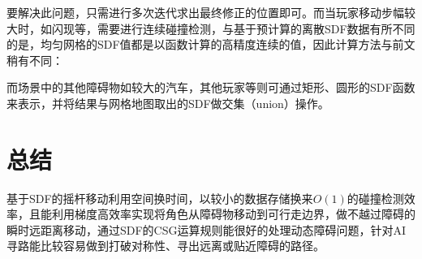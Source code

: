 要解决此问题，只需进行多次迭代求出最终修正的位置即可。而当玩家移动步幅较大时，如闪现等，需要进行连续碰撞检测，与基于预计算的离散SDF数据有所不同的是，均匀网格的SDF值都是以函数计算的高精度连续的值，因此计算方法与前文稍有不同：

\begin{Shaded}
\begin{Highlighting}[]
  
\NormalTok{;}
    \NormalTok{ (}\NormalTok{) \{}
        \NormalTok{) }
             \NormalTok{;}
        
        \NormalTok{) }
             \NormalTok{; }
        
             \NormalTok{;}
\NormalTok{        \}}
\NormalTok{    \}}
\NormalTok{\}}
\end{Highlighting}
\end{Shaded}

而场景中的其他障碍物如较大的汽车，其他玩家等则可通过矩形、圆形的SDF函数来表示，并将结果与网格地图取出的SDF做交集（union）操作。

\hypertarget{ux603bux7ed3}{%
\section{总结}\label{ux603bux7ed3}}

基于SDF的摇杆移动利用空间换时间，以较小的数据存储换来\(O(1)\)的碰撞检测效率，且能利用梯度高效率实现将角色从障碍物移动到可行走边界，做不越过障碍的瞬时远距离移动，通过SDF的CSG运算规则能很好的处理动态障碍问题，针对AI寻路能比较容易做到打破对称性、寻出远离或贴近障碍的路径。

